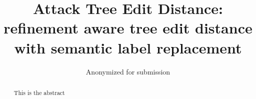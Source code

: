 \documentclass[format=sigconf]{acmart}
\begin{document}
\title{Attack Tree Edit Distance: refinement aware tree edit distance with semantic label replacement}

\iffalse{
    \author{Nathan D. Schiele}
    \orcid{0000-0003-1186-1503}
    \affiliation{\institution{Leiden University}
        \city{Leiden}
        \country{The Netherlands}}
    \email{n.d.schiele@liacs.leidenuniv.nl}


    \author{Olga Gadyatskaya}
    \orcid{0000-0002-3760-9165}
    \affiliation{\institution{Leiden University}
        \city{Leiden}
        \country{The Netherlands}}
    \email{o.gadyatskaya@liacs.leidenuniv.nl}
}\fi
\author{Anonymized for submission}









\begin{abstract}

    This is the abstract
\end{abstract}

\maketitle              %












\cite{*}



{}




\appendix
% 

% 
\end{document}
